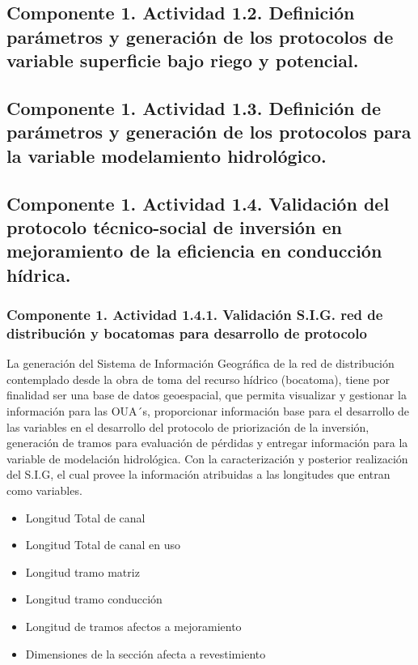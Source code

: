 \documentclass[]{article}
\begin{document}
\subsection{Componente 1. Actividad 1.2. Definición parámetros y generación de los protocolos de variable superficie bajo riego y potencial.}

\subsection{Componente 1. Actividad 1.3. Definición de parámetros y generación de los protocolos para la variable modelamiento hidrológico.}


\subsection{Componente 1. Actividad 1.4. Validación del protocolo técnico-social de inversión en mejoramiento de la eficiencia en conducción hídrica.}

\subsubsection{Componente 1. Actividad 1.4.1. Validación S.I.G. red de distribución y bocatomas para desarrollo de protocolo}

La generación del Sistema de Información Geográfica de la red de distribución contemplado desde la obra de toma del recurso hídrico (bocatoma), tiene por finalidad ser una base de datos geoespacial, que permita visualizar y gestionar la información para las OUA´s, proporcionar información base para el desarrollo de las variables en el desarrollo del protocolo de priorización de la inversión, generación de tramos para evaluación de pérdidas y  entregar información para la variable de modelación hidrológica. Con la caracterización y posterior realización del S.I.G, el cual provee la información atribuidas a las longitudes que entran como variables.
 
 \begin{itemize}
 \item  Longitud Total de canal
 \item  Longitud Total de canal en uso
 \item Longitud tramo matriz
 \item Longitud tramo conducción
 \item Longitud de tramos afectos a mejoramiento
 \item Dimensiones de la sección afecta a revestimiento
 
 \end{itemize}
\end{document}
